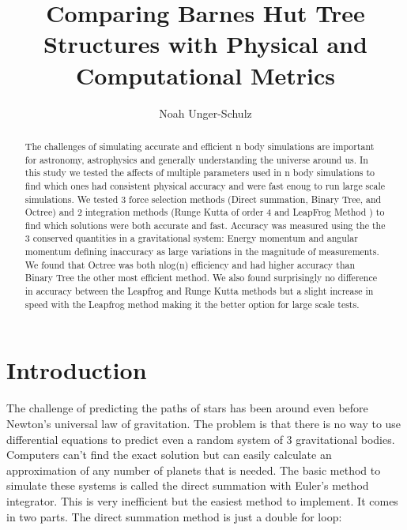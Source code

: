 \documentclass[11pt]{article}
\title{Comparing Barnes Hut Tree Structures with Physical and Computational Metrics}
\author{Noah Unger-Schulz}
\date{} %
\begin{document}
\maketitle

\begin{abstract}

 The challenges of simulating accurate and efficient n body simulations are important for astronomy, astrophysics and generally understanding the universe around us. In this study we tested the affects of multiple parameters used in n body simulations to find which ones had consistent physical accuracy and were fast enoug to run large scale simulations. We tested 3 force selection methods (Direct summation, Binary Tree, and Octree) and 2 integration methods (Runge Kutta of order 4 and LeapFrog Method ) to find which solutions were both accurate and fast. Accuracy was measured using the the 3 conserved quantities in a gravitational system: Energy momentum and angular momentum defining inaccuracy as large variations in the magnitude of measurements. We found that Octree was both nlog(n) efficiency and had higher accuracy than Binary Tree the other most efficient method. We also found surprisingly no difference in accuracy between the Leapfrog and Runge Kutta methods but a slight increase in speed with the Leapfrog method making it the better option for large scale tests.
  
  
  
  
\end{abstract}

\section{Introduction}

The challenge of predicting the paths of stars has been around even before Newton’s universal law of gravitation. The problem is that there is no way to use differential equations to predict even a random system of 3 gravitational bodies. Computers can’t find the exact solution but can easily calculate an approximation of any number of planets that is needed. The basic method to simulate these systems is called the direct summation with Euler's method integrator. This is very inefficient but the easiest method to implement. It comes in two parts. The direct summation method is just a double for loop:
\end{document}
